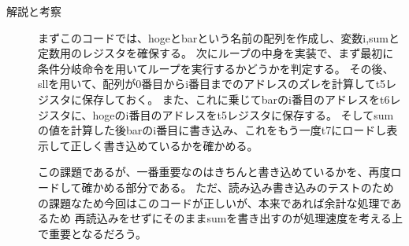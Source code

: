 \documentclass{jsarticle}
\begin{document}
\begin{description}
\begin{description}
          \item[解説と考察]
          まずこのコードでは、hogeとbarという名前の配列を作成し、変数i,sumと定数用のレジスタを確保する。
          次にループの中身を実装で、まず最初に条件分岐命令を用いてループを実行するかどうかを判定する。
          その後、sllを用いて、配列が0番目からi番目までのアドレスのズレを計算してt5レジスタに保存しておく。
          また、これに乗じてbarのi番目のアドレスをt6レジスタに、hogeのi番目のアドレスをt5レジスタに保存する。
          そしてsumの値を計算した後barのi番目に書き込み、これをもう一度t7にロードし表示して正しく書き込めているかを確かめる。

          この課題であるが、一番重要なのはきちんと書き込めているかを、再度ロードして確かめる部分である。
          ただ、読み込み書き込みのテストのための課題なため今回はこのコードが正しいが、本来であれば余計な処理であるため
          再読込みをせずにそのままsumを書き出すのが処理速度を考える上で重要となるだろう。
          
      \end{description}
  \end{description}
\end{document}
